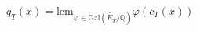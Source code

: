 \documentclass[preview]{standalone}
\begin{document}
\begin{center}
$\displaystyle q_T(x) = \text{lcm}_{\varphi \in \text{Gal}(\widetilde{E_T}/\mathbb{Q})} \varphi(c_T(x))$
\end{center}
\end{document}
